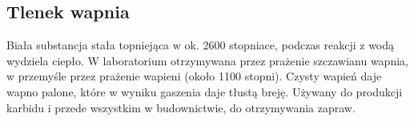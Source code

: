 \subsection{Tlenek wapnia }
Biała substancja stała topniejąca w ok. 2600 stopniace, podczas reakcji z wodą wydziela ciepło.
W laboratorium otrzymywana przez prażenie szczawianu wapnia, w przemyśle przez prażenie wapieni (około 1100 stopni).
Czysty wapień daje wapno palone, które w wyniku gaszenia daje tłustą breję.
Używany do produkcji karbidu i przede wszystkim w budownictwie, do otrzymywania zapraw.

